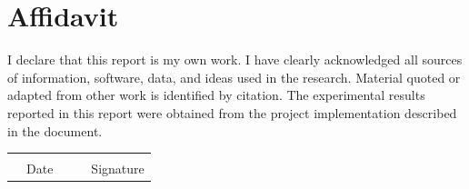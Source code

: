 \chapter*{Affidavit}\label{affidavit}
{}%
%
%
\prevspace
%
\noindent I declare that this report is my own work. I have clearly acknowledged
all sources of information, software, data, and ideas used in the research.
Material quoted or adapted from other work is identified by citation. The
experimental results reported in this report were obtained from the project
implementation described in the document.


\vspace{3.5cm}

\begin{tabular}{p{1cm}p{4cm}p{2cm}p{1cm}p{4cm}}
    & \hrulefill & & & \hrulefill\\
    & Date & & & Signature
\end{tabular}
